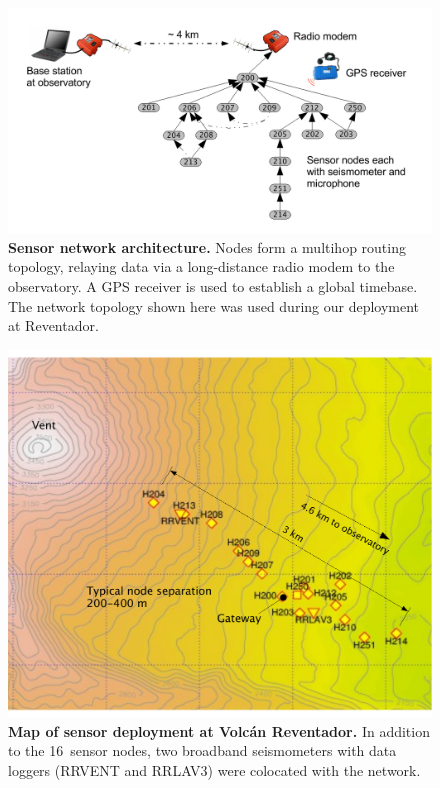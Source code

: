 \begin{figure}[t]
\label{evaluation-fig-schematic}
\begin{center}
\includegraphics[width=1.0\hsize]{./5-evaluation/figs/pics/schematic2.pdf}
\end{center}
\caption{\textbf{Sensor network architecture.} Nodes form a
multihop routing topology, relaying data via a long-distance radio
modem to the observatory. A GPS receiver is used to establish a global
timebase. The network topology shown here was used during
our deployment at Reventador.}
\end{figure}

\begin{figure}[t]
\label{evaluation-fig-map}
\begin{center}
\includegraphics[width=1.0\hsize]{./5-evaluation/figs/pics/reventador-map-crop.pdf}
\end{center}
\caption{\textbf{Map of sensor deployment at Volc\'{a}n Reventador.}
In addition to the 16~sensor nodes, two broadband seismometers
with data loggers (RRVENT and RRLAV3) were colocated with the network.}
\end{figure}

